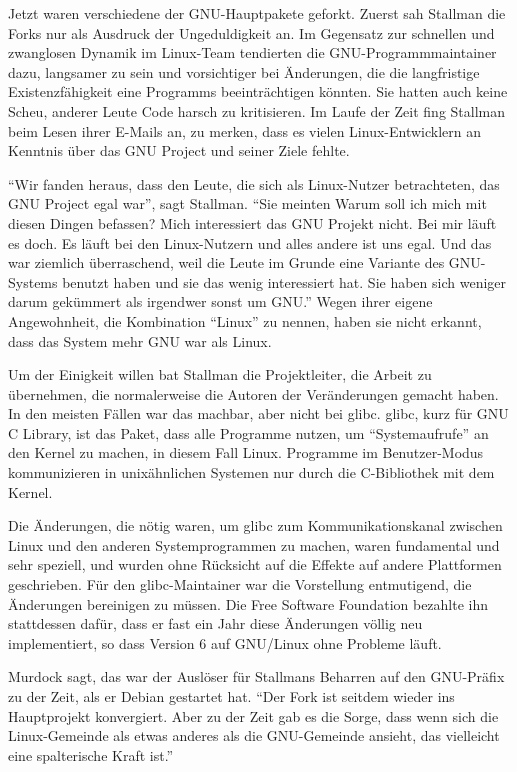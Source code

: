 Jetzt waren verschiedene der GNU-Hauptpakete geforkt. Zuerst sah Stallman die Forks nur als Ausdruck der Ungeduldigkeit an. Im Gegensatz zur schnellen und zwanglosen Dynamik im Linux-Team tendierten die GNU-Programmmaintainer dazu, langsamer zu sein und vorsichtiger bei Änderungen, die die langfristige Existenzfähigkeit eine Programms beeinträchtigen könnten. Sie hatten auch keine Scheu, anderer Leute Code harsch zu kritisieren. Im Laufe der Zeit fing Stallman beim Lesen ihrer E-Mails an, zu merken, dass es vielen Linux-Entwicklern an Kenntnis über das GNU Project und seiner Ziele fehlte.

"`Wir fanden heraus, dass den Leute, die sich als \glq Linux-Nutzer\grq{} betrachteten, das GNU Project egal war"', sagt Stallman. "`Sie meinten \glq Warum soll ich mich mit diesen Dingen befassen? Mich interessiert das GNU Projekt nicht. Bei mir läuft es doch. Es läuft bei den Linux-Nutzern und alles andere ist uns egal.\grq{} Und das war ziemlich überraschend, weil die Leute im Grunde eine Variante des GNU-Systems benutzt haben und sie das wenig interessiert hat. Sie haben sich weniger darum gekümmert als irgendwer sonst um GNU."' Wegen ihrer eigene Angewohnheit, die Kombination "`Linux"' zu nennen, haben sie nicht erkannt, dass das System mehr GNU war als Linux.

Um der Einigkeit willen bat Stallman die Projektleiter, die Arbeit zu übernehmen, die normalerweise die Autoren der Veränderungen gemacht haben. In den meisten Fällen war das machbar, aber nicht bei glibc. glibc, kurz für GNU C Library, ist das Paket, dass alle Programme nutzen, um "`Systemaufrufe"' an den Kernel zu machen, in diesem Fall Linux. Programme im Benutzer-Modus kommunizieren in unixähnlichen Systemen nur durch die C-Bibliothek mit dem Kernel.

Die Änderungen, die nötig waren, um glibc zum Kommunikationskanal zwischen Linux und den anderen Systemprogrammen zu machen, waren fundamental und sehr speziell, und wurden ohne Rücksicht auf die Effekte auf andere Plattformen geschrieben.
Für den glibc-Maintainer war die Vorstellung entmutigend, die Änderungen bereinigen zu müssen. Die Free Software Foundation bezahlte ihn stattdessen dafür, dass er fast ein Jahr diese Änderungen völlig neu implementiert, so dass Version 6 auf GNU/Linux ohne Probleme läuft.

Murdock sagt, das war der Auslöser für Stallmans Beharren auf den GNU-Präfix zu der Zeit, als er Debian gestartet hat. "`Der Fork ist seitdem wieder ins Hauptprojekt konvergiert. Aber zu der Zeit gab es die Sorge, dass wenn sich die Linux-Gemeinde als etwas anderes als die GNU-Gemeinde ansieht, das vielleicht eine spalterische Kraft ist."'

